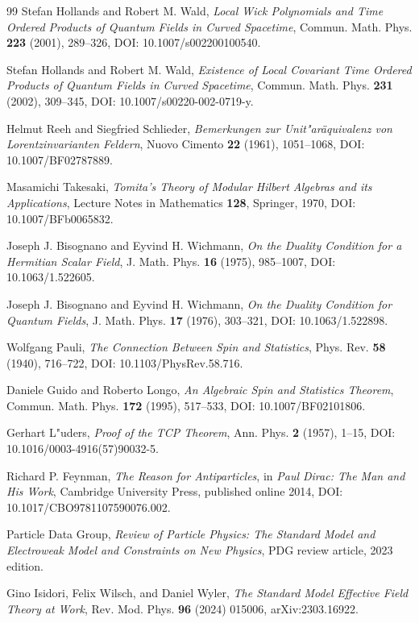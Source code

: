 \documentclass[11pt,a4paper]{article}
\begin{document}
\begin{thebibliography}{99}
Stefan Hollands and Robert M. Wald,
\emph{Local Wick Polynomials and Time Ordered Products of Quantum Fields in Curved Spacetime},
Commun. Math. Phys. \textbf{223} (2001), 289--326,
DOI: 10.1007/s002200100540.

Stefan Hollands and Robert M. Wald,
\emph{Existence of Local Covariant Time Ordered Products of Quantum Fields in Curved Spacetime},
Commun. Math. Phys. \textbf{231} (2002), 309--345,
DOI: 10.1007/s00220-002-0719-y.

Helmut Reeh and Siegfried Schlieder,
\emph{Bemerkungen zur Unit"aräquivalenz von Lorentzinvarianten Feldern},
Nuovo Cimento \textbf{22} (1961), 1051--1068,
DOI: 10.1007/BF02787889.

Masamichi Takesaki,
\emph{Tomita's Theory of Modular Hilbert Algebras and its Applications},
Lecture Notes in Mathematics \textbf{128}, Springer, 1970,
DOI: 10.1007/BFb0065832.

Joseph J. Bisognano and Eyvind H. Wichmann,
\emph{On the Duality Condition for a Hermitian Scalar Field},
J. Math. Phys. \textbf{16} (1975), 985--1007,
DOI: 10.1063/1.522605.

Joseph J. Bisognano and Eyvind H. Wichmann,
\emph{On the Duality Condition for Quantum Fields},
J. Math. Phys. \textbf{17} (1976), 303--321,
DOI: 10.1063/1.522898.

Wolfgang Pauli,
\emph{The Connection Between Spin and Statistics},
Phys. Rev. \textbf{58} (1940), 716--722,
DOI: 10.1103/PhysRev.58.716.

Daniele Guido and Roberto Longo,
\emph{An Algebraic Spin and Statistics Theorem},
Commun. Math. Phys. \textbf{172} (1995), 517--533,
DOI: 10.1007/BF02101806.

Gerhart L"uders,
\emph{Proof of the TCP Theorem},
Ann. Phys. \textbf{2} (1957), 1--15,
DOI: 10.1016/0003-4916(57)90032-5.

Richard P. Feynman,
\emph{The Reason for Antiparticles},
in \emph{Paul Dirac: The Man and His Work},
Cambridge University Press, published online 2014,
DOI: 10.1017/CBO9781107590076.002.

Particle Data Group,
\emph{Review of Particle Physics: The Standard Model and Electroweak Model and Constraints on New Physics},
PDG review article, 2023 edition.

Gino Isidori, Felix Wilsch, and Daniel Wyler,
\emph{The Standard Model Effective Field Theory at Work},
Rev. Mod. Phys. \textbf{96} (2024) 015006,
arXiv:2303.16922.

\end{thebibliography}
\end{document}
